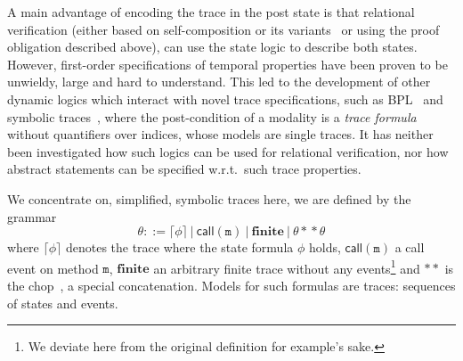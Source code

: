 A main advantage of encoding the trace in the post state is that relational verification (either based on self-composition or its variants~\cite{DBLP:conf/spc/DarvasHS05,DBLP:conf/csfw/BartheDR04,DBLP:conf/fm/BartheCK11} or using the proof obligation described above),
can use the state logic to describe both states.
However, first-order specifications of temporal properties have been proven to be unwieldy, large and hard to understand. 
This led to the development of other dynamic logics which interact with novel trace specifications, such as BPL~\cite{DBLP:conf/tableaux/Kamburjan19} and symbolic traces~\cite{DBLP:conf/tableaux/BubelDHN15}, where the post-condition of a modality is a \emph{trace formula} without quantifiers over indices, whose models are single traces.
It has neither been investigated how such logics can be used for relational verification, nor how abstract statements can be specified w.r.t.\ such trace properties.


We concentrate on, simplified, symbolic traces here, we are defined by the grammar
\[\theta ::= \lceil \phi \rceil ~|~ \mathsf{call}(\mathtt{m}) ~|~ \mathbf{finite} ~|~ \theta \ast\!\ast \theta \]
where $\lceil \phi \rceil$ denotes the trace where the state formula $\phi$ holds, $\mathsf{call}(\mathtt{m})$ a call event on method $\mathtt{m}$, $\mathbf{finite}$ an arbitrary finite trace without any events\footnote{We deviate here from the original definition for example's sake.} and $\ast\ast$ is the chop~\cite{DBLP:conf/tableaux/BubelDHN15}, a special concatenation.
Models for such formulas are traces: sequences of states and events.

